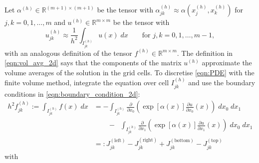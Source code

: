 \documentclass[11pt]{article}
\begin{document}
Let $\alpha^{(h)}\in\mathbb{R}^{(m+1)\times(m+1)}$ be the tensor with $\alpha^{(h)}_{jk}\approx \alpha(x^{(h)}_j,x^{(h)}_k)$ for $j,k=0,1,\dots,m$ and $u^{(h)}\in\mathbb{R}^{m\times m}$ be the tensor with
\begin{equation}
    u^{(h)}_{jk}\approx \frac{1}{h^2}\int_{I^{(h)}_{jk}} u(x)\; dx\qquad\text{for $j,k=0,1,\dots,m-1$},\label{eqn:vol_avg_2d}
\end{equation}
with an analogous definition of the tensor $f^{(h)}\in \mathbb{R}^{m\times m}$. The definition in \eqref{eqn:vol_avg_2d} says that the components of the matrix $u^{(h)}$ approximate the volume averages of the solution in the grid cells. To discretise \eqref{eqn:PDE} with the finite volume method, integrate the equation over cell $I_{jk}^{(h)}$ and use the boundary conditions in \eqref{eqn:boundary_condition_2d}:
\begin{equation}
    \begin{aligned}
       h^2f^{(h)}_{jk} :=\int_{I^{(h)}_{jk}} f(x)\;dx&=
    -\int_{I^{(h)}_{jk}} \frac{\partial}{\partial x_0}\left(\exp[\alpha(x)]\frac{\partial u}{\partial x_0}(x)\right)\;dx_0\;dx_1 \\
    &\qquad-\;\;\int_{I^{(h)}_{jk}} \frac{\partial}{\partial x_1}\left(\exp[\alpha(x)]\frac{\partial u}{\partial x_1}(x)\right)\;dx_0\;dx_1 \\
    &=: J_{jk}^{(\text{left})} - J_{jk}^{(\text{right})} + J_{jk}^{(\text{bottom})} - J_{jk}^{(\text{top})}
    \end{aligned}
\end{equation}
with
\end{document}
